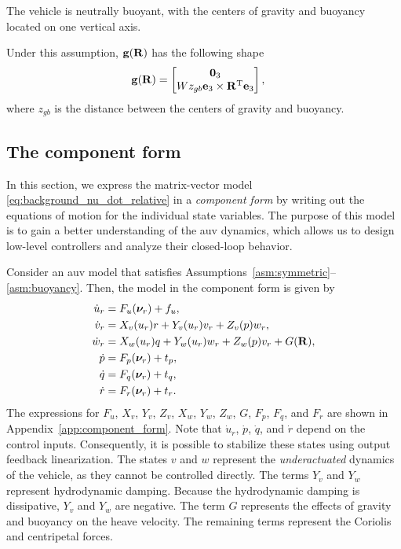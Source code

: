 \begin{asm}
    \label{asm:buoyancy}
    The vehicle is neutrally buoyant, with the centers of gravity and buoyancy located on one vertical axis.
\end{asm}
\noindent Under this assumption, $\mathbf{g}(\mathbf{R})$ has the following shape
\begin{align}
    \mathbf{g}(\mathbf{R}) &= \begin{bmatrix}
        \mathbf{0}_3 \\ Wz_{gb} \mathbf{e}_3 \times \mathbf{R}^{\mathrm{T}} \mathbf{e}_3
    \end{bmatrix},
    \label{eq:gravity}
\end{align}
where $z_{gb}$ is the distance between the centers of gravity and buoyancy.

\subsection{The component form}
\label{sec:model_component}
In this section, we express the matrix-vector model \eqref{eq:background_nu_dot_relative} in a \emph{component form} by writing out the equations of motion for the individual state variables.
The purpose of this model is to gain a better understanding of the \gls{auv} dynamics, which allows us to design low-level controllers and analyze their closed-loop behavior.

Consider an \gls{auv} model that satisfies Assumptions~\ref{asm:symmetric}--\ref{asm:buoyancy}.
Then, the model in the component form is given by
\begin{subequations}
    \begin{align}
        \dot{u}_r &= F_u(\bm{\nu}_r) + f_u, \\
        \dot{v}_r &= X_v(u_r)r + Y_v(u_r)v_r + Z_v(p)w_r, \\
        \dot{w}_r &= X_w(u_r)q + Y_w(u_r)w_r + Z_w(p)v_r + G(\mathbf{R}), \\
        \dot{p} &= F_p(\bm{\nu}_r) + t_p, \\
        \dot{q} &= F_q(\bm{\nu}_r) + t_q, \\
        \dot{r} &= F_r(\bm{\nu}_r) + t_r.
    \end{align}
    \label{eq:background_component_form}
\end{subequations}
The expressions for $F_u$, $X_v$, $Y_v$, $Z_v$, $X_w$, $Y_w$, $Z_w$, $G$, $F_p$, $F_q$, and $F_r$ are shown in Appendix~\ref{app:component_form}.
Note that $\dot{u}_r$, $\dot{p}$, $\dot{q}$, and $\dot{r}$ depend on the control inputs.
Consequently, it is possible to stabilize these states using output feedback linearization.
The states $v$ and $w$ represent the \emph{underactuated} dynamics of the vehicle, as they cannot be controlled directly.
The terms $Y_v$ and $Y_w$ represent hydrodynamic damping.
Because the hydrodynamic damping is dissipative, $Y_v$ and $Y_w$ are negative.
The term $G$ represents the effects of gravity and buoyancy on the heave velocity.
The remaining terms represent the Coriolis and centripetal forces.

